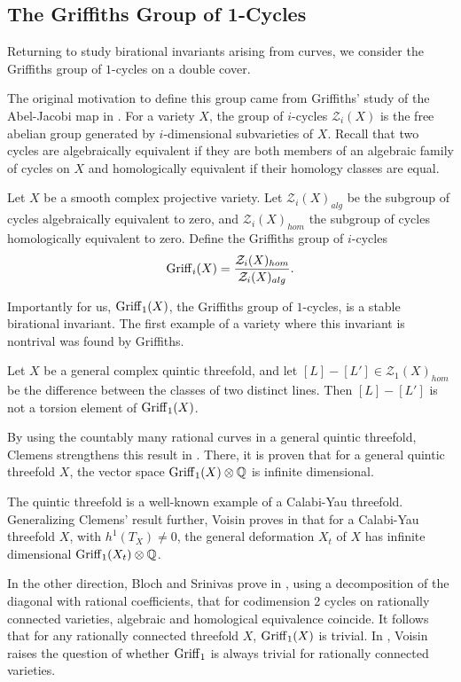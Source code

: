 \subsection{The Griffiths Group of 1-Cycles}
Returning to study birational invariants arising from curves, we consider the Griffiths group of $1$-cycles on a double cover.

The original motivation to define this group came from Griffiths' study of the Abel-Jacobi map in \cite{GriffithsPeriodsAlgebraicI}. For a variety $X$, the group of $i$-cycles $\mathcal{Z}_i(X)$ is the free abelian group generated by $i$-dimensional subvarieties of $X$. Recall that two cycles are algebraically equivalent if they are both members of an algebraic family of cycles on $X$ and homologically equivalent if their homology classes are equal.
\begin{definition}
	Let $X$ be a smooth complex projective variety. Let $\mathcal{Z}_i(X)_{alg}$ be the subgroup of cycles algebraically equivalent to zero, and $\mathcal{Z}_i(X)_{hom}$ the subgroup of cycles homologically equivalent to zero. Define the Griffiths group of $i$-cycles
	\[\operatorname{Griff}_i(X) = \frac{\mathcal{Z}_i(X)_{hom}}{\mathcal{Z}_i(X)_{alg}}. \]
\end{definition}
Importantly for us, $\operatorname{Griff}_1(X)$, the Griffiths group of $1$-cycles, is a stable birational invariant. The first example of a variety where this invariant is nontrival was found by Griffiths.

\begin{theorem}
	Let $X$ be a general complex quintic threefold, and let $[L]-[L'] \in \mathcal{Z}_1(X)_{hom}$ be the difference between the classes of two distinct lines. Then $[L]-[L']$ is not a torsion element of $\operatorname{Griff}_1(X)$.
\end{theorem}
By using the countably many rational curves in a general quintic threefold, Clemens strengthens this result in \cite{ClemensNotFinitelyGenerated}. There, it is proven that for a general quintic threefold $X$, the vector space $\operatorname{Griff}_1(X) \otimes \mathbb{Q}$ is infinite dimensional.

The quintic threefold is a well-known example of a Calabi-Yau threefold. Generalizing Clemens' result further, Voisin proves in \cite{VoisinGriffithsCalabi-Yau} that for a Calabi-Yau threefold $X$, with $h^1(T_X) \neq 0$, the general deformation $X_t$ of $X$ has infinite dimensional $\operatorname{Griff}_1(X_t) \otimes \mathbb{Q}$.

In the other direction, Bloch and Srinivas prove in \cite{BSCorrespondences}, using a decomposition of the diagonal with rational coefficients, that for codimension 2 cycles on rationally connected varieties, algebraic and homological equivalence coincide. It follows that for any rationally connected threefold $X$, $\operatorname{Griff}_1(X)$ is trivial. In \cite{VoisinDoD}, Voisin raises the question of whether $\operatorname{Griff}_1$ is always trivial for rationally connected varieties.

